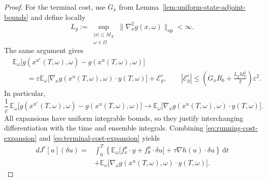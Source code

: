 \documentclass[11pt]{amsart}
\numberwithin{equation}{section} %
\newcommand{\dd}{\mathrm{d}}
\theoremstyle{remark}
\begin{document}
\begin{proof}
For the terminal cost, use $G_x$ from
Lemma~\ref{lem:uniform-state-adjoint-bounds} and define locally
\[
L_g:=\sup_{\substack{|x|\le M_X\\\omega\in\Omega}}
\|\nabla_x^2g(x,\omega)\|_{\mathrm{op}}<\infty.
\]
The same argument gives
\begin{align*}
&\mathbb E_\omega
\bigl[g(x^{u^\varepsilon}(T,\omega),\omega)
-g(x^u(T,\omega),\omega)\bigr]\\
&\qquad=\varepsilon\mathbb E_\omega
\bigl[\nabla_xg(x^u(T,\omega),\omega)\cdot y(T,\omega)\bigr]
+\mathcal E_g^\varepsilon,
\qquad
|\mathcal E_g^\varepsilon|
\le\left(G_xR_b+\frac{L_gM_Y^2}{2}\right)\varepsilon^2.
\end{align*}
In particular,
\begin{equation}
\label{eq:terminal-cost-expansion}
\frac{1}{\varepsilon}\,\mathbb E_\omega
\bigl[g(x^{u^\varepsilon}(T,\omega),\omega)
-g(x^u(T,\omega),\omega)\bigr]
\longrightarrow
\mathbb E_\omega
\bigl[\nabla_xg(x^u(T,\omega),\omega)\cdot y(T,\omega)\bigr].
\end{equation}
All expansions have uniform integrable bounds, so they justify
interchanging differentiation with the time and ensemble integrals.
Combining \eqref{eq:running-cost-expansion} and \eqref{eq:terminal-cost-expansion} yields
\begin{align}
\label{eq:pre-adjoint-first-variation}
dJ^\tau[u](\delta u)
={}&\int_0^T\left\{\mathbb E_\omega
\bigl[f_x^u\cdot y+f_\theta^u\cdot\delta u\bigr]
+\tau\nabla h(u)\cdot\delta u\right\}\,\dd t
\nonumber\\
&+\mathbb E_\omega
\bigl[\nabla_xg(x^u(T,\omega),\omega)\cdot y(T,\omega)\bigr].
\end{align}


\end{proof}
\end{document}

